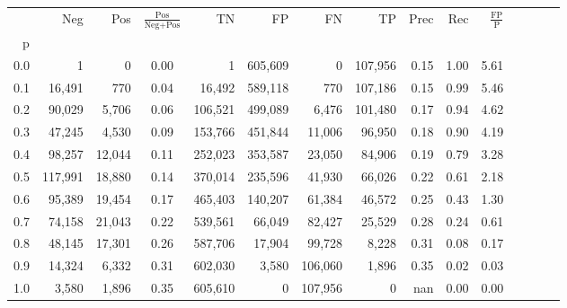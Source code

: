 \begin{tabular}{rrrcrrrrrrrrrrr}
\toprule
{} &      Neg &     Pos & $\frac{\text{Pos}}{\text{Neg}+\text{Pos}}$ &       TN &       FP &       FN &       TP &  Prec &   Rec & $\frac{\text{FP}}{\text{P}}$ \\
p   &          &         &                                            &          &          &          &          &       &       &                              \\
\midrule
0.0 &        1 &       0 &                                       0.00 &        1 &  605,609 &        0 &  107,956 &  0.15 &  1.00 &                         5.61 \\
0.1 &   16,491 &     770 &                                       0.04 &   16,492 &  589,118 &      770 &  107,186 &  0.15 &  0.99 &                         5.46 \\
0.2 &   90,029 &   5,706 &                                       0.06 &  106,521 &  499,089 &    6,476 &  101,480 &  0.17 &  0.94 &                         4.62 \\
0.3 &   47,245 &   4,530 &                                       0.09 &  153,766 &  451,844 &   11,006 &   96,950 &  0.18 &  0.90 &                         4.19 \\
0.4 &   98,257 &  12,044 &                                       0.11 &  252,023 &  353,587 &   23,050 &   84,906 &  0.19 &  0.79 &                         3.28 \\
0.5 &  117,991 &  18,880 &                                       0.14 &  370,014 &  235,596 &   41,930 &   66,026 &  0.22 &  0.61 &                         2.18 \\
0.6 &   95,389 &  19,454 &                                       0.17 &  465,403 &  140,207 &   61,384 &   46,572 &  0.25 &  0.43 &                         1.30 \\
0.7 &   74,158 &  21,043 &                                       0.22 &  539,561 &   66,049 &   82,427 &   25,529 &  0.28 &  0.24 &                         0.61 \\
0.8 &   48,145 &  17,301 &                                       0.26 &  587,706 &   17,904 &   99,728 &    8,228 &  0.31 &  0.08 &                         0.17 \\
0.9 &   14,324 &   6,332 &                                       0.31 &  602,030 &    3,580 &  106,060 &    1,896 &  0.35 &  0.02 &                         0.03 \\
1.0 &    3,580 &   1,896 &                                       0.35 &  605,610 &        0 &  107,956 &        0 &   nan &  0.00 &                         0.00 \\
\bottomrule
\end{tabular}

